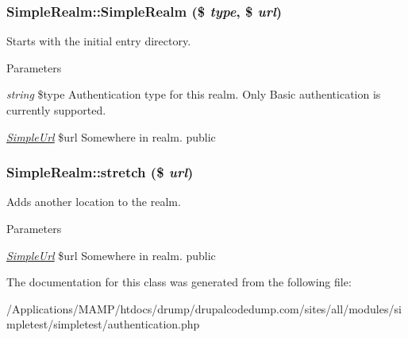 \hypertarget{class_simple_realm_a697001a75f6b1c5e54c8427ede4cbe37}{
\subsubsection[{SimpleRealm}]{\setlength{\rightskip}{0pt plus 5cm}SimpleRealm::SimpleRealm (\$ {\em type}, \/  \$ {\em url})}}
\label{class_simple_realm_a697001a75f6b1c5e54c8427ede4cbe37}
Starts with the initial entry directory. 
\begin{DoxyParams}{Parameters}
\item[{\em string}]\$type Authentication type for this realm. Only Basic authentication is currently supported. \item[{\em \hyperlink{class_simple_url}{SimpleUrl}}]\$url Somewhere in realm.  public \end{DoxyParams}
\hypertarget{class_simple_realm_a9337bb639d1bf37b5dee82ca86ab5a8e}{
\subsubsection[{stretch}]{\setlength{\rightskip}{0pt plus 5cm}SimpleRealm::stretch (\$ {\em url})}}
\label{class_simple_realm_a9337bb639d1bf37b5dee82ca86ab5a8e}
Adds another location to the realm. 
\begin{DoxyParams}{Parameters}
\item[{\em \hyperlink{class_simple_url}{SimpleUrl}}]\$url Somewhere in realm.  public \end{DoxyParams}


The documentation for this class was generated from the following file:\begin{DoxyCompactItemize}
\item 
/Applications/MAMP/htdocs/drump/drupalcodedump.com/sites/all/modules/simpletest/simpletest/authentication.php\end{DoxyCompactItemize}
